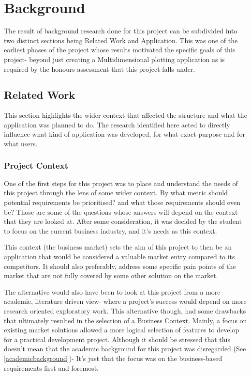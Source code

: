 \section{Background}

The result of background research done for this project can be subdivided into two distinct sections being Related Work and Application. This was one of the earliest phases of the project whose results motivated the specific goals of this project- beyond just creating a Multidimensional plotting application as is required by the honours assessment that this project falls under.

\subsection{Related Work}
This section highlights the wider context that affected the structure and what the application was planned to do. The research identified here acted to directly influence what kind of application was developed, for what exact purpose and for what users.

\subsubsection{Project Context}
One of the first steps for this project was to place and understand the needs of this project through the lens of some wider context. By what metric should potential requirements be prioritised? and what those requirements should even be? Those are some of the questions whose answers will depend on the context that they are looked at. After some consideration, it was decided by the student to focus on the current business industry, and it’s needs as this context.

\begin{displayquote}
    This context (the business market) sets the aim of this project to then be an application that would be considered a valuable market entry compared to its competitors. It should also preferably, address some specific pain points of the market that are not fully covered by some other solution on the market.
\end{displayquote}

The alternative would also have been to look at this project from a more academic, literature driven view- where a project’s success would depend on more research oriented exploratory work. This alternative though, had some drawbacks that ultimately resulted in the selection of a Business Context. Mainly, a focus on existing market solutions allowed a more logical selection of features to develop for a practical development project. Although it should be stressed that this doesn’t mean that the academic background for this project was disregarded (See \ref{academicbackground})- It’s just that the focus was on the business-based requirements first and foremost.

